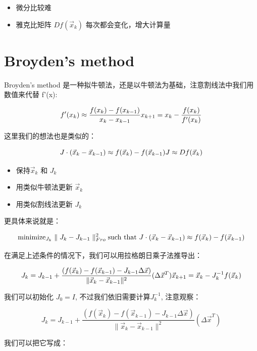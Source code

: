 \documentclass[
]{book}
\providecommand{\tightlist}{%
  \setlength{\itemsep}{0pt}\setlength{\parskip}{0pt}}
\begin{document}
\begin{itemize}
\tightlist
\item
  微分比较难
\item
  雅克比矩阵 \(Df(\vec{x}_k)\) 每次都会变化，增大计算量
\end{itemize}

\hypertarget{broydens-method}{%
\section{Broyden's method}\label{broydens-method}}

Broyden's method 是一种拟牛顿法，还是以牛顿法为基础，注意割线法中我们用数值来代替 f'(x):

\[
f'(x_{k}) \approx {\frac {f(x_{k})-f(x_{k-1})}{x_{k}-x_{k-1}}} \\
x_{k+1}=x_{k}-{\frac {f(x_{k})}{f'(x_{k})}}
\]

这里我们的想法也是类似的：

\[
J \cdot ( \vec{x}_{k} - \vec{x}_{k-1})  \approx   f(\vec{x}_{k}) - f(\vec{x}_{k-1})  \\
J \approx Df(\vec{x}_k)
\]

\begin{itemize}
\tightlist
\item
  保持\(\vec{x}_k\) 和 \(J_k\)
\item
  用类似牛顿法更新 \(\vec{x}_k\)
\item
  用类似割线法更新 \(J_k\)
\end{itemize}

更具体来说就是：

\[
 \text{minimize}_{J_k} \parallel J_k - J_{k-1} \parallel_{Fro} ^2 \\
 \text{such that  } J \cdot ( \vec{x}_{k} - \vec{x}_{k-1})  \approx   f(\vec{x}_{k}) - f(\vec{x}_{k-1}) 
\]

在满足上述条件的情况下，我们可以用拉格朗日乘子法推导出：

\[
J_k= J_{k-1}+{\frac { ( f(\vec{x}_k) - f(\vec{x}_{k-1}) - J_{k-1}\Delta \vec{x} ) }{\|\vec{x}_k - \vec{x}_{k-1} \|^{2}}} (\Delta \vec{x}^T)  \\
\vec{x}_{k+1} = \vec{x}_k - J_k^{-1} f(\vec{x}_k)
\]

我们可以初始化 \(J_0 = I\), 不过我们依旧需要计算\(J_k^{-1}\), 注意观察：

\[
J_k= J_{k-1}+{\frac { ( f(\vec{x}_k) - f(\vec{x}_{k-1}) - J_{k-1}\Delta \vec{x} ) }{\|\vec{x}_k - \vec{x}_{k-1} \|^{2}}} (\Delta \vec{x}^T)
\]

我们可以把它写成：
\end{document}
